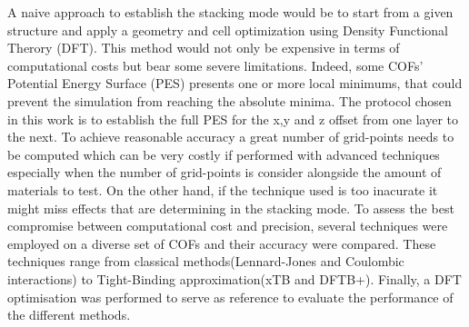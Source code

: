 A naive approach to establish the stacking mode would be to start from a given structure and apply a geometry and cell optimization using Density Functional Therory (DFT). This method would not only be expensive in terms of computational costs but bear some severe limitations. Indeed, some COFs' Potential Energy Surface (PES) presents one or more local minimums, that could prevent the simulation from reaching the absolute minima.
The protocol chosen in this work is to establish the full PES for the x,y and z offset from one layer to the next. 
To achieve reasonable accuracy a great number of grid-points needs to be computed which can be very costly if performed with advanced techniques especially when the number of grid-points is consider alongside the amount of materials to test. On the other hand, if the technique used is too inacurate it might miss effects that are determining in the stacking mode. To assess the best compromise between computational cost and precision, several techniques were employed on a diverse set of COFs and their accuracy were compared. These techniques range from classical methods(Lennard-Jones and Coulombic interactions) to Tight-Binding approximation(xTB and DFTB+). Finally, a DFT optimisation was performed to serve as reference to evaluate the performance of the different methods.



